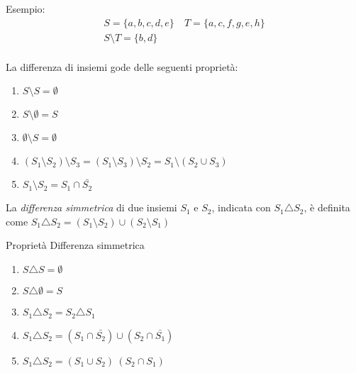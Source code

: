 Esempio:
\begin{align*}
S = \{a,b,c,d,e\} & \ T = \{a,c,f,g,e,h\} \\
S \setminus T = \{b,d\} \\
\end{align*}
\begin{prop}
    La differenza di insiemi gode delle seguenti proprietà:
\end{prop}
\begin{enumerate}
  \item $S \setminus S = \emptyset$
  \item $S \setminus \emptyset = S$
  \item $\emptyset \setminus S = \emptyset$
  \item $(S_1 \setminus S_2) \setminus S_3 =
         (S_1 \setminus S_3) \setminus S_2 = S_1 \setminus (S_2 \cup S_3)$
  \item $S_1 \setminus S_2 = S_1 \cap \bar{S_2}$
\end{enumerate}

La \textit{differenza simmetrica} di due insiemi $S_1$ e $S_2$, indicata con $S_1 \triangle S_2$,
è definita come $S_1 \triangle S_2 = (S_1 \setminus S_2) \cup (S_2 \setminus S_1) $

\begin{prop}
Proprietà Differenza simmetrica
\end{prop}
\begin{enumerate}
  \item $S \triangle S = \emptyset$
  \item $S \triangle \emptyset = S$
  \item $S_1 \triangle S_2 = S_2 \triangle S_1$
  \item $S_1 \triangle S_2 = (S_1 \cap \bar{S_2}) \cup (S_2 \cap \bar{S_1})$
  \item $S_1 \triangle S_2 = (S_1 \cup S_2) \ (S_2 \cap S_1)$
\end{enumerate}

